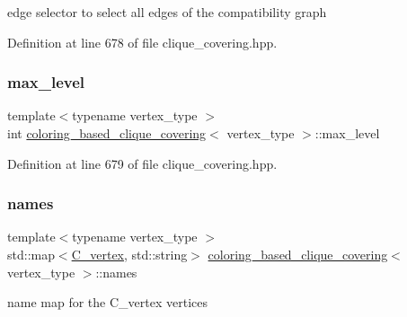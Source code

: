 edge selector to select all edges of the compatibility graph 



Definition at line 678 of file clique\+\_\+covering.\+hpp.

\mbox{\label{classcoloring__based__clique__covering_a02e09454313d3388cd1c8509a5b0b3eb}} 
\subsubsection{\texorpdfstring{max\+\_\+level}{max\_level}}
{\footnotesize\ttfamily template$<$typename vertex\+\_\+type $>$ \\
int \hyperlink{classcoloring__based__clique__covering}{coloring\+\_\+based\+\_\+clique\+\_\+covering}$<$ vertex\+\_\+type $>$\+::max\+\_\+level\hspace{0.3cm}{\ttfamily [private]}}



Definition at line 679 of file clique\+\_\+covering.\+hpp.

\mbox{\label{classcoloring__based__clique__covering_a4b77fb0def42cc016b3f99f15259e8d4}} 
\subsubsection{\texorpdfstring{names}{names}}
{\footnotesize\ttfamily template$<$typename vertex\+\_\+type $>$ \\
std\+::map$<$\hyperlink{clique__covering__graph_8hpp_a9cb45047ea8c5ed95a8cfa90494345aa}{C\+\_\+vertex}, std\+::string$>$ \hyperlink{classcoloring__based__clique__covering}{coloring\+\_\+based\+\_\+clique\+\_\+covering}$<$ vertex\+\_\+type $>$\+::names\hspace{0.3cm}{\ttfamily [protected]}}



name map for the C\+\_\+vertex vertices 



